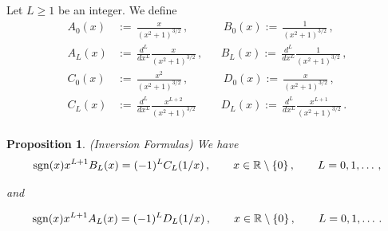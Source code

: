\documentclass{article}
\newtheorem{prop}[thm]{Proposition}
\theoremstyle{remark}
\numberwithin{equation}{section}
\begin{document}
Let $L \geq 1$ be an integer. We define
\begin{align*} A_0(x) & := \, \frac{x}{(x^2+1)^{3/2}}\,, && \  B_0(x) := \, \frac{1}{(x^2+1)^{3/2}}\,, \\
A_L(x) & := \, \frac{d^L}{dx^L} \frac{x}{(x^2+1)^{3/2}}\,, &&  B_L(x) := \, \frac{d^L}{dx^L} \frac{1}{(x^2+1)^{3/2}}\,, \\ 
C_0(x) & := \, \frac{x^2}{(x^2+1)^{3/2}}\,, && \ D_0(x) := \, \frac{x}{(x^2+1)^{3/2}}\,, \\
C_L(x) & := \, \frac{d^L}{dx^L} \frac{x^{L+2}}{(x^2+1)^{3/2}}\, && D_L(x) := \, \frac{d^L}{dx^L} \frac{x^{L+1}}{(x^2+1)^{3/2}}\,. \\  
\end{align*}

\begin{prop}\label{INVERSION} (Inversion Formulas)
We have
$$\text{\rm sgn}(x)x^{L+1} B_L(x) = (-1)^L C_L(1/x)\,, \qquad x \in {\mathbb R} \setminus \{0\}\,, \qquad L=0,1,\ldots\,,$$

and

$$\text{\rm sgn}(x)x^{L+1} A_L(x) = (-1)^L D_L(1/x)\,, \qquad x \in {\mathbb R} \setminus \{0\}\,, \qquad L=0,1,\ldots\,.$$
\end{prop}
\end{document}
